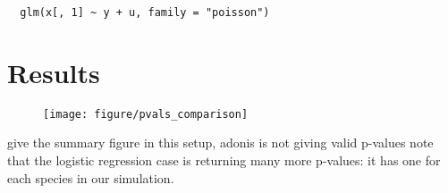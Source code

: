 \documentclass{article}
\newenvironment{code}{\captionsetup{type=listing}}{}
\begin{document}
\begin{code}
\begin{verbatim}
  glm(x[, 1] ~ y + u, family = "poisson")
\end{verbatim}
\end{code}

\section{Results}
\label{sec:results}

\begin{figure}
  \centering
  \texttt{[image: figure/pvals\_comparison]}
  \caption{\label{fig:pvals_comparison} }
\end{figure}

give the summary figure
in this setup, adonis is not giving valid p-values
note that the logistic regression case is returning many more p-values: it has
one for each species in our simulation.



\end{document}

